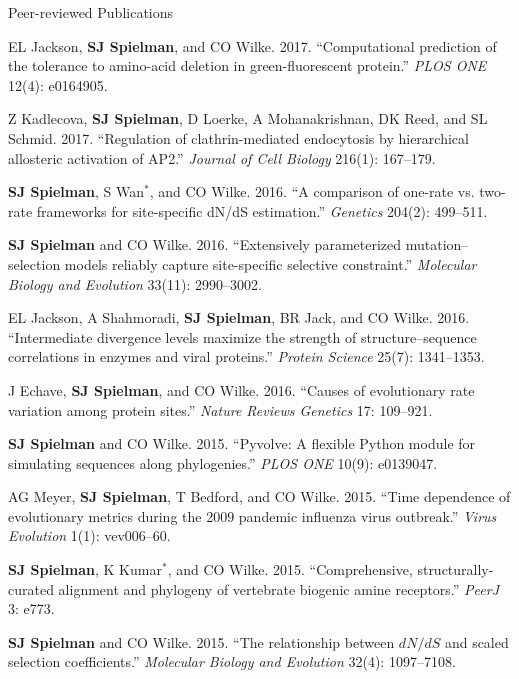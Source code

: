 \documentclass{resume} %
\begin{document}
\begin{rSection}{Peer-reviewed Publications}
\begin{etaremune}[leftmargin=1.5em]
\item EL Jackson, \textbf{SJ Spielman}, and CO Wilke. 2017. ``Computational prediction of the tolerance to amino-acid deletion in green-fluorescent protein.'' \emph{PLOS ONE} 12(4): e0164905.

\item Z Kadlecova, \textbf{SJ Spielman}, D Loerke, A Mohanakrishnan, DK Reed, and SL Schmid. 2017. ``Regulation of clathrin-mediated endocytosis by hierarchical allosteric activation of AP2.'' \emph{Journal of Cell Biology} 216(1): 167--179.

\item \textbf{SJ Spielman}, S Wan$^\ast$, and CO Wilke. 2016. ``A comparison of one-rate vs. two-rate frameworks for site-specific dN/dS estimation.'' \emph{Genetics} 204(2): 499--511.

\item \textbf{SJ Spielman} and CO Wilke. 2016. ``Extensively parameterized mutation--selection models reliably capture site-specific selective constraint.'' \emph{Molecular Biology and Evolution} 33(11): 2990--3002.

\item EL Jackson, A Shahmoradi, \textbf{SJ Spielman}, BR Jack, and CO Wilke. 2016. ``Intermediate divergence levels maximize the strength of structure--sequence correlations in enzymes and viral proteins.'' \emph{Protein Science} 25(7): 1341--1353.

\item J Echave, \textbf{SJ Spielman}, and CO Wilke. 2016. ``Causes of evolutionary rate variation among protein sites.'' \emph{Nature Reviews Genetics} 17: 109--921.

\item \textbf{SJ Spielman} and CO Wilke. 2015. ``Pyvolve: A flexible Python module for simulating sequences along phylogenies.'' \emph{PLOS ONE} 10(9): e0139047.

\item AG Meyer, \textbf{SJ Spielman}, T Bedford, and CO Wilke. 2015. ``Time dependence of evolutionary metrics during the 2009 pandemic influenza virus outbreak.'' \emph{Virus Evolution} 1(1): vev006--60.

\item \textbf{SJ Spielman}, K Kumar$^\ast$, and CO Wilke. 2015. ``Comprehensive, structurally-curated alignment and phylogeny of vertebrate biogenic amine receptors.'' \emph{PeerJ} 3: e773.

\item \textbf{SJ Spielman} and CO Wilke. 2015. ``The relationship between $dN/dS$ and scaled selection coefficients.'' \emph{Molecular Biology and Evolution} 32(4): 1097--7108.


\end{etaremune}
\end{rSection}
\end{document}
